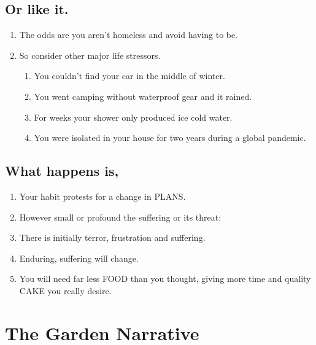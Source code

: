 \documentclass[
]{book}
\providecommand{\tightlist}{%
  \setlength{\itemsep}{0pt}\setlength{\parskip}{0pt}}
\begin{document}
\hypertarget{or-like-it.}{%
\subsection{Or like it.}\label{or-like-it.}}

\begin{enumerate}
\def\labelenumi{\arabic{enumi}.}
\setcounter{enumi}{28}
\tightlist
\item
  The odds are you aren't homeless and avoid having to be.
\item
  So consider other major life stressors.

  \begin{enumerate}
  \def\labelenumii{\arabic{enumii}.}
  \tightlist
  \item
    You couldn't find your car in the middle of winter.
  \item
    You went camping without waterproof gear and it rained.
  \item
    For weeks your shower only produced ice cold water.
  \item
    You were isolated in your house for two years during a global pandemic.
  \end{enumerate}
\end{enumerate}

\hypertarget{what-happens-is}{%
\subsection{What happens is,}\label{what-happens-is}}

\begin{enumerate}
\def\labelenumi{\arabic{enumi}.}
\setcounter{enumi}{30}
\tightlist
\item
  Your habit protests for a change in PLANS.
\item
  However small or profound the suffering or its threat:
\item
  There is initially terror, frustration and suffering.
\item
  Enduring, suffering will change.
\item
  You will need far less FOOD than you thought, giving more time and quality CAKE you really desire.
\end{enumerate}

\hypertarget{the-garden-narrative}{%
\section{The Garden Narrative}\label{the-garden-narrative}}
\end{document}

